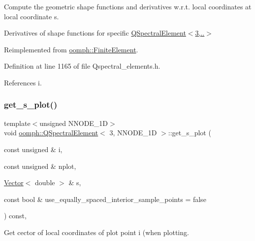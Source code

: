 Compute the geometric shape functions and derivatives w.\+r.\+t. local coordinates at local coordinate s. 

Derivatives of shape functions for specific \hyperlink{classoomph_1_1QSpectralElement_3_013_00_01NNODE__1D_01_4_a16dc807addb7036c30d794d65d2a0b73}{Q\+Spectral\+Element$<$3,..$>$} 

Reimplemented from \hyperlink{classoomph_1_1FiniteElement_a9db1456b827131c21a991ac9fedf4b0c}{oomph\+::\+Finite\+Element}.



Definition at line 1165 of file Qspectral\+\_\+elements.\+h.



References i.

\mbox{\label{classoomph_1_1QSpectralElement_3_013_00_01NNODE__1D_01_4_a87b3cae6dcb237585734eab89f13bb84}} 
\subsubsection{\texorpdfstring{get\+\_\+s\+\_\+plot()}{get\_s\_plot()}}
{\footnotesize\ttfamily template$<$unsigned N\+N\+O\+D\+E\+\_\+1D$>$ \\
void \hyperlink{classoomph_1_1QSpectralElement}{oomph\+::\+Q\+Spectral\+Element}$<$ 3, N\+N\+O\+D\+E\+\_\+1D $>$\+::get\+\_\+s\+\_\+plot (\begin{DoxyParamCaption}\item[{const unsigned \&}]{i,  }\item[{const unsigned \&}]{nplot,  }\item[{\hyperlink{classoomph_1_1Vector}{Vector}$<$ double $>$ \&}]{s,  }\item[{const bool \&}]{use\+\_\+equally\+\_\+spaced\+\_\+interior\+\_\+sample\+\_\+points = {\ttfamily false} }\end{DoxyParamCaption}) const\hspace{0.3cm}{\ttfamily [inline]}, {\ttfamily [virtual]}}



Get cector of local coordinates of plot point i (when plotting. 


